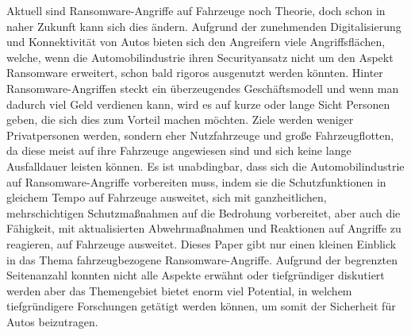 Aktuell sind Ransomware-Angriffe auf Fahrzeuge noch Theorie, doch schon in naher 
Zukunft kann sich dies ändern. Aufgrund der zunehmenden Digitalisierung und Konnektivität 
von Autos bieten sich den Angreifern viele Angriffsflächen, welche, wenn die Automobilindustrie 
ihren Securityansatz nicht um den Aspekt Ransomware erweitert, schon bald rigoros ausgenutzt 
werden könnten. Hinter Ransomware-Angriffen steckt ein überzeugendes Geschäftsmodell und wenn 
man dadurch viel Geld verdienen kann, wird es auf kurze oder lange Sicht Personen geben, die 
sich dies zum Vorteil machen möchten.
\newline
Ziele werden weniger Privatpersonen werden, sondern eher Nutzfahrzeuge und große Fahrzeugflotten, 
da diese meist auf ihre Fahrzeuge angewiesen sind und sich keine lange Ausfalldauer leisten können.
\newline
Es ist unabdingbar, dass sich die Automobilindustrie auf Ransomware-Angriffe vorbereiten muss, 
indem sie die Schutzfunktionen in gleichem Tempo auf Fahrzeuge ausweitet, sich mit ganzheitlichen, 
mehrschichtigen Schutzmaßnahmen auf die Bedrohung vorbereitet, aber auch die Fähigkeit, mit 
aktualisierten Abwehrmaßnahmen und Reaktionen auf Angriffe zu reagieren, auf Fahrzeuge ausweitet.
\newline
Dieses Paper gibt nur einen kleinen Einblick in das Thema fahrzeugbezogene Ransomware-Angriffe. 
Aufgrund der begrenzten Seitenanzahl konnten nicht alle Aspekte erwähnt oder tiefgründiger diskutiert 
werden aber das Themengebiet bietet enorm viel Potential, in welchem tiefgründigere Forschungen 
getätigt werden können, um somit der Sicherheit für Autos beizutragen. 
